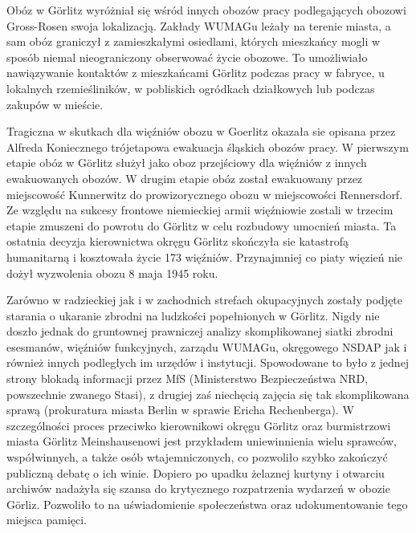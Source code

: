 \documentclass[a4paper,12pt,ngerman,
]{nisebook}
\begin{document}
Obóz w Görlitz wyróżniał się wśród innych obozów pracy podlegających obozowi Gross-Rosen swoja lokalizacją. Zakłady WUMAGu leżały na terenie miasta, a sam obóz graniczył z zamieszkałymi osiedlami, których mieszkańcy mogli w sposób niemal nieograniczony obserwować życie obozowe. To umożliwiało nawiązywanie kontaktów z mieszkańcami Görlitz podczas pracy w fabryce, u lokalnych rzemieśliników, w pobliskich ogródkach działkowych lub podczas zakupów w mieście.

Tragiczna w skutkach dla więźniów obozu w Goerlitz okazała sie opisana przez Alfreda Koniecznego trójetapowa ewakuacja śląskich obozów pracy. W pierwszym etapie obóz w Görlitz służył jako oboz przejściowy dla więźniów z innych ewakuowanych obozów. W drugim etapie obóz został ewakuowany przez miejscowość Kunnerwitz do prowizorycznego obozu w miejscowości Rennersdorf. Ze względu na sukcesy frontowe niemieckiej armii więźniowie zostali w trzecim etapie zmuszeni do powrotu do Görlitz w celu rozbudowy umocnień miasta. Ta ostatnia decyzja kierownictwa okręgu Görlitz skończyła sie katastrofą humanitarną i kosztowała życie 173 więźniów. Przynajmniej co piaty więzień nie dożył wyzwolenia obozu 8 maja 1945 roku.

Zarówno w radzieckiej jak i w zachodnich strefach okupacyjnych zostały podjęte starania o ukaranie zbrodni na ludzkości popełnionych w Görlitz. Nigdy nie doszło jednak do gruntownej prawniczej analizy skomplikowanej siatki zbrodni esesmanów, więźniów funkcyjnych, zarządu WUMAGu, okręgowego NSDAP jak i również innych podległych im urzędów i instytucji. Spowodowane to było z jednej strony blokadą informacji przez MfS (Ministerstwo Bezpieczeństwa NRD, powszechnie zwanego Stasi), z drugiej zaś niechęcią zajęcia się tak skomplikowana sprawą (prokuratura miasta Berlin w sprawie Ericha Rechenberga). W szczególności proces przeciwko kierownikowi okręgu Görlitz oraz burmistrzowi miasta Görlitz Meinshausenowi jest przykładem uniewinnienia wielu sprawców, współwinnych, a także osób wtajemniczonych, co pozwoliło szybko zakończyć publiczną debatę o ich winie. Dopiero po upadku żelaznej kurtyny i otwarciu archiwów nadażyła się szansa do krytycznego rozpatrzenia wydarzeń w obozie Görliz. Pozwoliło to na uświadomienie społeczeństwa oraz udokumentowanie tego miejsca pamięci. 

 
\end{document}
